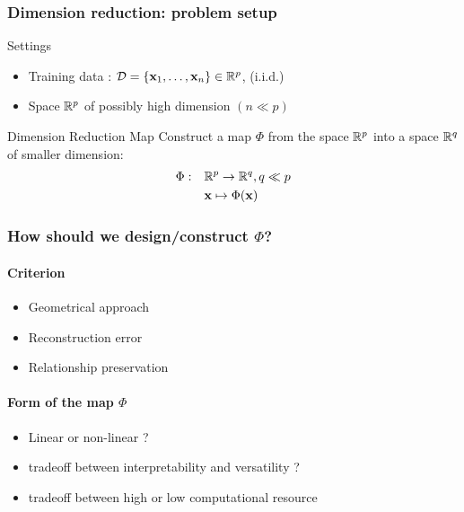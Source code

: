 \documentclass{beamer}\usepackage[]{graphicx}\usepackage[]{color}
\begin{document}
\begin{frame}
  \frametitle{Dimension reduction: problem setup}

    \begin{block}{Settings}
      \begin{itemize}
        \item \alert{Training data} : $\mathcal{D}=\{\mathbf{x}_1,\ldots,\mathbf{x}_n\} \in \mathbb{R}^p$,   (i.i.d.)
        \item Space $\mathbb{R}^p$ of possibly high dimension $(n \ll p)$
      \end{itemize}
    \end{block}

    \vfill
    
    \begin{block}{Dimension Reduction Map}
       Construct a map $\Phi$ from the space $\mathbb{R}^{p}$ into a space $\mathbb{R}^{q}$ of \alert{smaller dimension}:
      \begin{align*}
          \Phi:\quad & \mathbb{R}^p \to \mathbb{R}^{q}, q \ll p\\
                     & \mathbf{x} \mapsto \Phi(\mathbf{x})
      \end{align*}
    \end{block}
    
\end{frame}
 
\begin{frame}
  \frametitle{How should we design/construct $\Phi$?}

  \paragraph{Criterion}
  \begin{itemize}
    \item Geometrical approach
    \item Reconstruction error
    \item Relationship preservation
  \end{itemize}

  \vfill
  
  \paragraph{Form of the map $\Phi$}
  \begin{itemize}
    \item Linear or non-linear ?
    \item tradeoff between interpretability and versatility ?
    \item tradeoff between high or low computational resource
  \end{itemize}

\end{frame}
 
\end{document}
